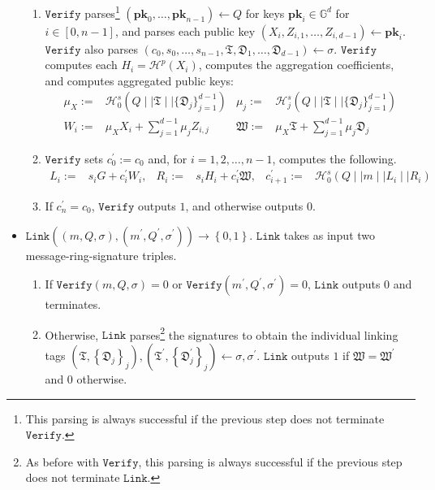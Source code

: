 \documentclass{llncs}
\begin{document}
\begin{definition}[$d$-CLSAG]
\begin{itemize}
\begin{enumerate}
\item $\texttt{Verify}$ parses\footnote{This parsing is always successful if the previous step does not terminate $\texttt{Verify}$.} $(\textbf{pk}_0, \ldots, \textbf{pk}_{n-1}) \leftarrow Q$ for keys $\textbf{pk}_i \in \mathbb{G}^d$ for $i \in [0,n-1]$, and parses each public key $(X_i, Z_{i, 1}, \ldots, Z_{i, d-1}) \leftarrow \textbf{pk}_i$.  $\texttt{Verify}$ also parses $(c_0, s_0, \ldots, s_{n-1}, \mathfrak{T}, \mathfrak{D}_1, \ldots, \mathfrak{D}_{d - 1}) \leftarrow \sigma$. $\texttt{Verify}$ computes each $H_i = \mathcal{H}^p(X_i)$, computes the aggregation coefficients, and computes aggregated public keys:
\begin{align*}
\mu_X := & \mathcal{H}^s_0(Q \mid \mid \mathfrak{T} \mid \mid \{\mathfrak{D}_j\}_{j=1}^{d-1}) & \mu_j := & \mathcal{H}^s_j(Q \mid \mid \mathfrak{T} \mid \mid \{\mathfrak{D}_j\}_{j=1}^{d-1})\\
W_i :=& \mu_X X_i + \sum_{j=1}^{d-1} \mu_j Z_{i,j} & \mathfrak{W} :=& \mu_X \mathfrak{T} + \sum_{j=1}^{d-1} \mu_j \mathfrak{D}_j
\end{align*}

\item $\texttt{Verify}$ sets $c_0^\prime := c_0$ and, for $i=1, 2, \ldots, n-1$, computes the following.
\begin{align*}
L_i :=& s_i G + c_i^\prime W_i, &
R_i :=& s_i H_i + c_i^\prime\mathfrak{W}, &
c_{i+1}^\prime :=& \mathcal{H}^s_0\left(Q \mid \mid m \mid \mid L_i \mid \mid R_i\right)
\end{align*}
\item If $c_{n}^\prime = c_0$, $\texttt{Verify}$ outputs $1$, and otherwise outputs $0$.
\end{enumerate}

\item $\texttt{Link}\left((m, Q, \sigma), (m^\prime, Q^\prime, \sigma^\prime)\right) \to \left\{0,1\right\}$. $\texttt{Link}$ takes as input two message-ring-signature triples.
\begin{enumerate}
\item If $\texttt{Verify}(m, Q, \sigma) = 0$ or $\texttt{Verify}(m^\prime, Q^\prime, \sigma^\prime) = 0$, $\texttt{Link}$ outputs $0$ and terminates.

\item Otherwise, $\texttt{Link}$ parses\footnote{As before with $\texttt{Verify}$, this parsing is always successful if the previous step does not terminate $\texttt{Link}$.} the signatures to obtain the individual linking tags $(\mathfrak{T}, \left\{\mathfrak{D}_j\right\}_j), (\mathfrak{T}^\prime, \left\{\mathfrak{D}^\prime_j\right\}_j) \leftarrow \sigma, \sigma^\prime$. $\texttt{Link}$ outputs $1$ if $\mathfrak{W} = \mathfrak{W}^\prime$ and $0$ otherwise.
\end{enumerate}
\end{itemize}
\end{definition}
\end{document}
